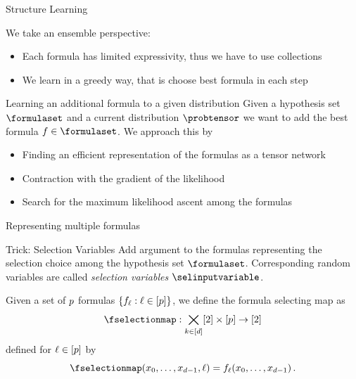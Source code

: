\documentclass{beamer}
\begin{document}
\begin{frame}{Structure Learning}

We take an ensemble perspective: 
\begin{itemize}
	\item Each formula has limited expressivity, thus we have to use collections
	\item We learn in a greedy way, that is choose best formula in each step
\end{itemize}

\begin{block}{Learning an additional formula to a given distribution}
	Given a hypothesis set $\formulaset$ and a current distribution $\probtensor$ we want to add the best formula $\exformulain$.
	We approach this by
	\begin{itemize}
		\item Finding an efficient representation of the formulas as a tensor network
		\item Contraction with the gradient of the likelihood 
		\item Search for the maximum likelihood ascent among the formulas
	\end{itemize}
\end{block}

\end{frame}



\begin{frame}{Representing multiple formulas}

\begin{block}{Trick: Selection Variables}
	Add argument to the formulas representing the selection choice among the hypothesis set $\formulaset$.
	Corresponding random variables are called \emph{selection variables} $\selinputvariable$. 
\end{block}

	Given a set of $p$ formulas $\{f_{\ell} : \ell\in[p]\}$, we define the formula selecting map as
		\[  \fselectionmap : \atomstates \times [\seldim] \rightarrow [2] \]
	defined for $\ell\in[p]$ by
		\[ \fselectionmap(\atomindices,\selindex) =  \exformula_{\selindex}(\atomindices) \, . \]

\end{frame}
\end{document}
